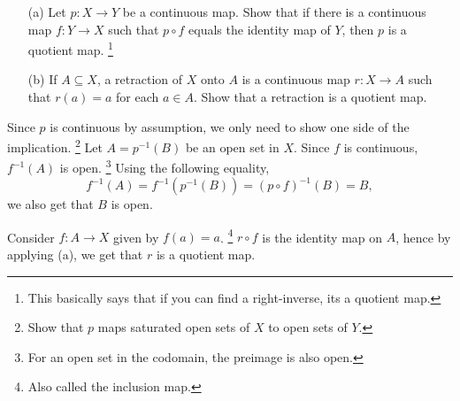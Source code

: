\documentclass[../../main.tex]{subfiles}
\begin{document}
\begin{problem}[\S22 Ex. 2]
$ $
\begin{itemize}
    \item[(a)] Let $p: X \to Y$ be a continuous map.
	      Show that if there is a continuous map $f : Y \to X$ such that $p \circ f$ equals the identity map of $Y$, then $p$ is a quotient map.
          \footnote{This basically says that if you can find a right-inverse, its a quotient map.}

    \item[(b)] If $A \subseteq X$, a retraction of $X$ onto $A$ is a continuous map $r : X \to A$ such that $r(a) = a$ for each $a \in A$.
	      Show that a retraction is a quotient map.
\end{itemize}
\end{problem}

Since $p$ is continuous by assumption, we only need to show one side of the implication.
\footnote{Show that $p$ maps saturated open sets of $X$ to open sets of $Y$.}
Let $A = p^{-1}(B)$ be an open set in $X$.
Since $f$ is continuous, $f^{-1}(A)$ is open.
\footnote{For an open set in the codomain, the preimage is also open.}
Using the following equality,
\begin{equation*}
	f^{-1}(A) = f^{-1}(p^{-1}(B)) = (p \circ f)^{-1}(B) = B,
\end{equation*}
we also get that $B$ is open.

Consider $f: A \to X$ given by $f(a) = a$.
\footnote{Also called the inclusion map.}
$r \circ f$ is the identity map on $A$, hence by applying (a), we  get that $r$ is a quotient map.
\end{document}

